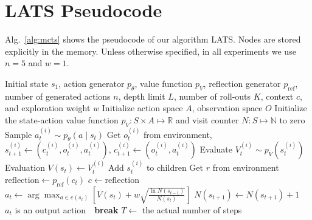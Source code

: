 \documentclass{article} \usepackage{iclr2024_conference,times}
\begin{document}
\section{LATS Pseudocode}
\label{sec:pseudocode}
Alg.~\ref{alg:mcts} shows the pseudocode of our algorithm LATS. Nodes are stored explicitly in the memory. Unless otherwise specified, in all experiments we use $n=5$ and $w=1$.
\begin{algorithm}[ht]
\centering
\caption{$\operatorname{LATS}(S_0, p_\theta, {p_V}, p_{\text{ref}}, d, k, n, w)$ \label{alg:mcts}}
\begin{minipage}{0.9\linewidth} 
\small
\begin{algorithmic}
    \Require Initial state $s_1$, action generator $p_\theta$, value function {$p_V$}, reflection generator $p_{\text{ref}}$, number of generated actions $n$, depth limit $L$, number of roll-outs $K$, context $c$, and exploration weight $w$
    \State Initialize action space $A$, observation space $O$
    \State Initialize the state-action value function ${p_V} : S \times A \mapsto \mathbb R$ and visit counter ${N} : S \mapsto \mathbb N$ to zero
             
                \State Sample $a_t^{(i)} \sim p_\theta(a \mid s_t)$
                \State Get $o_t^{(i)}$ from environment, $s_{t+1}^{(i)} \gets (c_{t}^{(i)}, o_t^{(i)}, a_t^{(i)})$, $c_{t+1}^{(i)} \gets (o_t^{(i)}, a_t^{(i)})$
                \State Evaluate ${V}_t^{(i)} \sim {p_V}(s_t^{(i)})$
                \Comment Evaluation
                \State ${V}(s_t) \gets {V}_t^{(i)}$
                \State Add $s_t^{(i)}$ to children
                \EndFor
            \EndIf
                \State Get $r$ from environment
                    \State $\text{reflection} \gets p_{\text{ref}}(c_t)$
                    \State $c \gets \text{reflection}$
                \EndIf
            \EndIf
            \State $a_t \gets \arg\max_{a \in e(s_t)} \left[ {V(s_t)} + w \sqrt{\frac{\ln {N}(s_{t-1})}{{N}(s_t)}} \right]$ 
            \State ${N}(s_{t+1}) \gets {N}(s_{t+1}) + 1$
            \State \algorithmicif\ {$a_t$ is an output action}\ \algorithmicthen\ \textbf{break}
        \EndFor
        \State $T \gets$ the actual number of steps
         
        \EndFor
    \EndFor
\end{algorithmic}
\end{minipage}
\end{algorithm}
\end{document}
